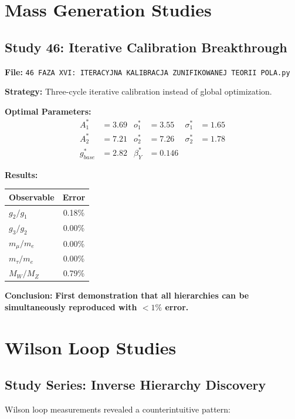 \documentclass[11pt,a4paper]{book}
\theoremstyle{remark}
\begin{document}
\section{Mass Generation Studies}

\subsection{Study 46: Iterative Calibration Breakthrough}

\textbf{File:} \texttt{46 FAZA XVI: ITERACYJNA KALIBRACJA ZUNIFIKOWANEJ TEORII POLA.py}

\textbf{Strategy:} Three-cycle iterative calibration instead of global optimization.

\textbf{Optimal Parameters:}
\begin{align}
A_1^* &= 3.69 & o_1^* &= 3.55 & \sigma_1^* &= 1.65 \\
A_2^* &= 7.21 & o_2^* &= 7.26 & \sigma_2^* &= 1.78 \\
g_{base}^* &= 2.82 & \beta_Y^* &= 0.146 &
\end{align}

\textbf{Results:}
\begin{table}[H]
\centering
\begin{tabular}{|l|c|}
\hline
\textbf{Observable} & \textbf{Error} \\
\hline
$g_2/g_1$ & 0.18\% \\
$g_3/g_2$ & 0.00\% \\
$m_\mu/m_e$ & 0.00\% \\
$m_\tau/m_e$ & 0.00\% \\
$M_W/M_Z$ & 0.79\% \\
\hline
\end{tabular}
\end{table}

\textbf{Conclusion:} \textbf{First demonstration that all hierarchies can be simultaneously reproduced with $<1\%$ error.}

\section{Wilson Loop Studies}

\subsection{Study Series: Inverse Hierarchy Discovery}

Wilson loop measurements revealed a counterintuitive pattern:
\end{document}

